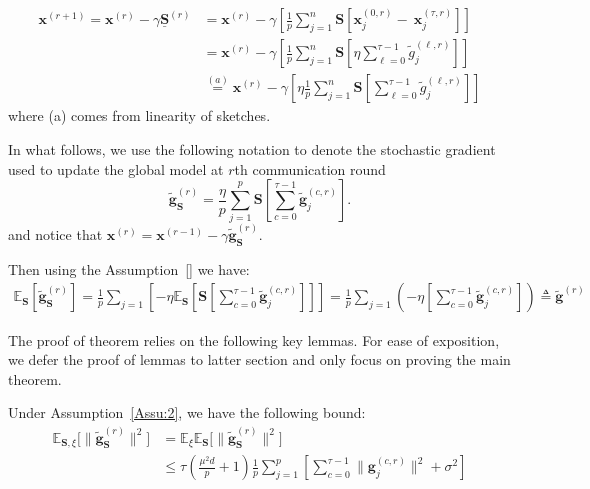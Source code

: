 \begin{align}
     {\boldsymbol{x}}^{(r+1)}=\boldsymbol{x}^{(r)}-\gamma\underline{\mathbf{S}}^{(r)}&=\boldsymbol{x}^{(r)}-\gamma\left[\frac{1}{p}\sum_{j=1}^n\mathbf{S}\left[\boldsymbol{x}_j^{(0,r)}-~{\boldsymbol{x}}_{j}^{(\tau,r)}\right]\right]\nonumber\\
     &=\boldsymbol{x}^{(r)}-\gamma\left[\frac{1}{p}\sum_{j=1}^n\mathbf{S}\left[\eta\sum_{\ell=0}^{\tau-1}\tilde{g}_j^{(\ell,r)}\right]\right]\nonumber\\
     &\stackrel{(a)}{=}\boldsymbol{x}^{(r)}-\gamma\left[\eta\frac{1}{p}\sum_{j=1}^n\mathbf{S}\left[\sum_{\ell=0}^{\tau-1}\tilde{g}_j^{(\ell,r)}\right]\right]\label{eq:update-rule-dec}
\end{align}
where (a) comes from linearity of sketches.


In what follows, we use the following notation to denote the stochastic gradient used to update the global model at $r$th communication round $$\tilde{\mathbf{g}}_{\mathbf{S}}^{(r)}=\frac{\eta}{p}\sum_{j=1}^{p}\mathbf{S}\left[\sum_{c=0}^{\tau-1}\tilde{\mathbf{g}}_j^{(c,r)}\right].$$ 
and notice that $\boldsymbol{x}^{(r)} = \boldsymbol{x}^{(r-1)} - \gamma \tilde{\mathbf{g}}_{\mathbf{S}}^{(r)}$.


Then using the Assumption~\ref{} we have:
\begin{align}
  \mathbb{E}_{\mathbf{S}}\left[\tilde{\mathbf{g}}_{\mathbf{S}}^{(r)}\right]=\frac{1}{p}\sum_{j=1}\left[-\eta\mathbb{E}_{\mathbf{S}}\left[ \mathbf{S}\left[\sum_{c=0}^{\tau-1}\tilde{\mathbf{g}}_j^{(c,r)}\right]\right]\right]=\frac{1}{p}\sum_{j=1}\left(-\eta\left[\sum_{c=0}^{\tau-1}\tilde{\mathbf{g}}_j^{(c,r)}\right]\right)\triangleq \tilde{\mathbf{g}}^{(r)}\label{eq:unbiased_gd} 
\end{align}

The proof of theorem relies on the following key lemmas. For ease of exposition, we defer the proof of lemmas to latter section and only focus on proving the main theorem. 

\begin{lemma}\label{lemma:tasbih1-iid}
Under Assumption~\ref{Assu:2}, we have the following bound: 
\begin{align}
\mathbb{E}_{\mathbf{S},\xi}\Big[\|\tilde{\mathbf{g}}_\mathbf{S}^{(r)}\|^2\Big]&=\mathbb{E}_{\xi}\mathbb{E}_{\mathbf{S}}\Big[\|\tilde{\mathbf{g}}_\mathbf{S}^{(r)}\|^2\Big]\nonumber\\
&\leq \tau(\frac{\mu^2 d}{p}+1)\frac{1}{p}\sum_{j=1}^p\left[\sum_{c=0}^{\tau-1}\|\mathbf{g}_j^{(c,r)}\|^2+\sigma^2\right] \label{eq:lemma1}
\end{align}
\end{lemma}

